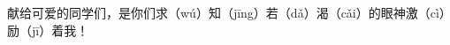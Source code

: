 
\thispagestyle{empty}

\begin{center}
献给可爱的同学们，是你们求（wú）知（jīng）若（dǎ）渴（cǎi）的眼神激（cì）励（jī）着我！
\end{center}

\setlength{\abovedisplayskip}{-5pt}
\setlength{\abovedisplayshortskip}{-5pt}
